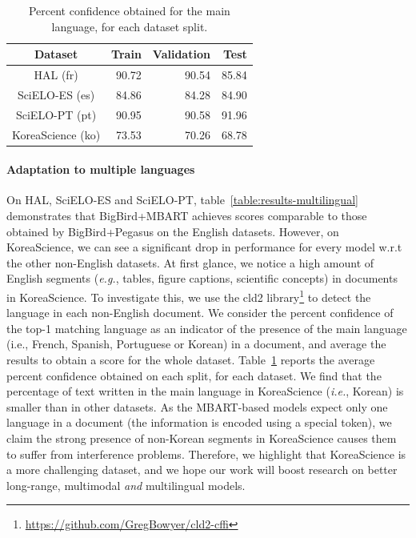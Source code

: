\begin{table}[ht]
\centering
\small
\begin{tabular}{crrr}
\toprule
\textbf{Dataset} & \textbf{Train} & \textbf{Validation} & \textbf{Test} \\
\midrule
HAL (fr)                                 & 90.72                     & 90.54                          & 85.84                    \\
SciELO-ES (es)                            & 84.86                     & 84.28                          & 84.90                    \\
SciELO-PT (pt)                           & 90.95                     & 90.58                          & 91.96                    \\
KoreaScience (ko) & 73.53                     & 70.26                          & 68.78       \\            
\bottomrule
\end{tabular}
\caption{Percent confidence obtained for the main language, for each dataset split.}
\label{tablepercentage-main-lang}
\end{table}

\paragraph{Adaptation to multiple languages} On HAL, SciELO-ES and SciELO-PT, table~\ref{table:results-multilingual} demonstrates that BigBird+MBART achieves scores comparable to those obtained by BigBird+Pegasus on the English datasets. However, on KoreaScience, we can see a significant drop in performance for every model w.r.t the other non-English datasets. At first glance, we notice a high amount of English segments (\textit{e.g.}, tables, figure captions, scientific concepts) in documents in KoreaScience. To investigate this, we use the cld2 library\footnote{\url{https://github.com/GregBowyer/cld2-cffi}} to detect the language in each non-English document. We consider the percent confidence of the top-1 matching language as an indicator of the presence of the main language (i.e., French, Spanish, Portuguese or Korean) in a document, and average the results to obtain a score for the whole dataset. Table~\ref{tablepercentage-main-lang} reports the average percent confidence obtained on each split, for each dataset. We find that the percentage of text written in the main language in KoreaScience (\textit{i.e.}, Korean) is smaller than in other datasets. As the MBART-based models expect only one language in a document (the information is encoded using a special token), we claim the strong presence of non-Korean segments in KoreaScience causes them to suffer from interference problems. Therefore, we highlight that KoreaScience is a more challenging dataset, and we hope our work will boost research on better long-range, multimodal \textit{and} multilingual models.


